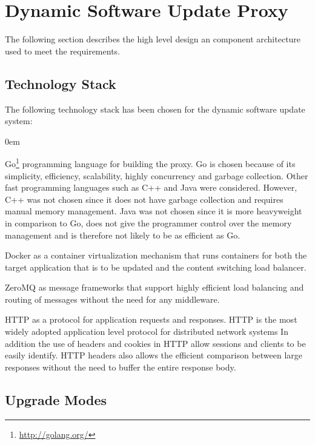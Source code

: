 \documentclass[a4paper,11pt,twoside]{report}
\begin{document}
\section{Dynamic Software Update Proxy} 

The following section describes the high level design an component architecture used to meet the requirements.

\subsection{Technology Stack} 
The following technology stack has been chosen for the dynamic software update system:

\begin{list}{-}{}
  \itemsep0em
  \item Go\footnote{\url{http://golang.org/}} programming language for building the proxy. Go is chosen because of its simplicity, efficiency, scalability, highly concurrency and garbage collection. Other fast programming languages such as C++ and Java were considered. However, C++ was not chosen since it does not have garbage collection and requires manual memory management. Java was not chosen since it is more heavyweight in comparison to Go, does not give the programmer control over the memory management and is therefore not likely to be as efficient as Go.
    
  \item Docker as a container virtualization mechanism that runs containers for both the target application that is to be updated and the content switching load balancer.
  
  \item ZeroMQ as message frameworks that support highly efficient load balancing and routing of messages without the need for any middleware.
  
  \item HTTP as a protocol for application requests and responses.  HTTP is the most widely adopted application level protocol for distributed network systems In addition the use of headers and cookies in HTTP allow sessions and clients to be easily identify.  HTTP headers also allows the efficient comparison between large responses without the need to buffer the entire response body.
\end{list}
  
\subsection{Upgrade Modes}\label{modes}
  
\end{document}
